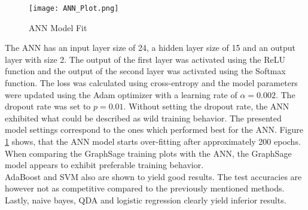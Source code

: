   \begin{figure}[h]
		\centering
		\texttt{[image: ANN\_Plot.png]}
		\caption{ANN Model Fit}
        \label{fig:ANN_fit}
  \end{figure}

  \noindent The ANN has an input layer size of 24, a hidden layer size of 15
  and an output layer with size 2. The output of the first layer was activated
  using the ReLU function and the output of the second layer was activated
  using the Softmax function. The loss was calculated using cross-entropy and
  the model parameters were updated using the Adam optimizer with a learning
  rate of $\alpha=0.002$. The dropout rate was set to $p=0.01$. Without setting 
  the dropout rate, the ANN exhibited what could be described as wild training 
  behavior. The presented model settings correspond to the ones which performed 
  best for the ANN. Figure \ref{fig:ANN_fit} shows, that the ANN model starts 
  over-fitting after approximately 200 epochs. When comparing the GraphSage 
  training plots with the ANN, the GraphSage model appears to exhibit preferable 
  training behavior. \\

  \noindent AdaBoost and SVM also are shown to yield good results. The test
  accuracies are however not as competitive compared to the previously
  mentioned methods. Lastly, naive bayes, QDA and logistic regression clearly
  yield inferior results. 
